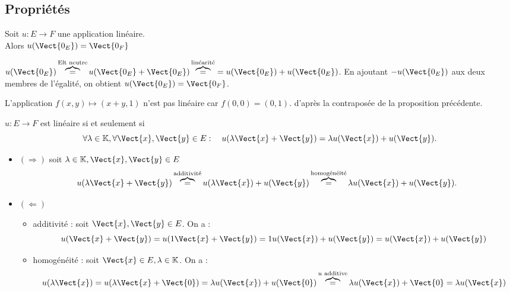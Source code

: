 \documentclass{book}
\begin{document}
\subsection{Propriétés}
\begin{Proposition}[0 image de 0]
Soit $u:E\to F$ une application linéaire.\\
Alors $u(\Vect{0_E})=\Vect{0_F}$
\end{Proposition}
\begin{Demonstration}
$u(\Vect{0_E})\overbrace{=}^{\text{Elt neutre}}u(\Vect{0_E}+\Vect{0_E})\overbrace{=}^{\text{linéarité}}=u(\Vect{0_E})+u(\Vect{0_E})$. En ajoutant  $-u(\Vect{0_E})$ aux deux membres de l'égalité, on obtient $u(\Vect{0_E})=\Vect{0_F}$.
\end{Demonstration}
\begin{Exemple} 
L'application $f(x,y)\mapsto (x+y,1)$ n'est pas linéaire car $f(0,0)=(0,1).$ d'après la contraposée de la proposition précédente. 
\end{Exemple}
\begin{Proposition}
$u:E\to F$ est linéaire si et seulement si
$$\forall   \lambda  \in  \K , \forall   \Vect{x},\Vect{y}\in  E:\quad u(\lambda \Vect{x} +  \Vect{y}) = \lambda u(\Vect{x}) +  u(\Vect{y}).$$
\end{Proposition}
\begin{Demonstration}
\begin{itemize}
\item $(\Longrightarrow)$  soit $\lambda  \in  \K ,    \Vect{x},\Vect{y}\in E$
$$u(\lambda \Vect{x} +  \Vect{y})\overbrace{=}^{\text{additivité}}u(\lambda \Vect{x}) +  u(\Vect{y})\overbrace{=}^{\text{homogénéité}}\lambda u( \Vect{x}) +  u(\Vect{y}).$$
\item $(\Longleftarrow)$ 
\begin{itemize}
\item additivité : soit  $\Vect{x},\Vect{y}\in  E$. On a :
$$u(\Vect{x}+\Vect{y})=u(1\Vect{x}+\Vect{y})=1u(\Vect{x})+u(\Vect{y})=u(\Vect{x})+u(\Vect{y})$$
\item homogénéité : soit  $\Vect{x}\in  E,\lambda\in\K$. On a :
$$u(\lambda\Vect{x})=u(\lambda\Vect{x}+\Vect{0})=\lambda u(\Vect{x})+u(\Vect{0})\overbrace{=}^{u \text{ additive}}\lambda u(\Vect{x})+\Vect{0}=\lambda u(\Vect{x})$$
\end{itemize}
\end{itemize}
\end{Demonstration}
\end{document}
